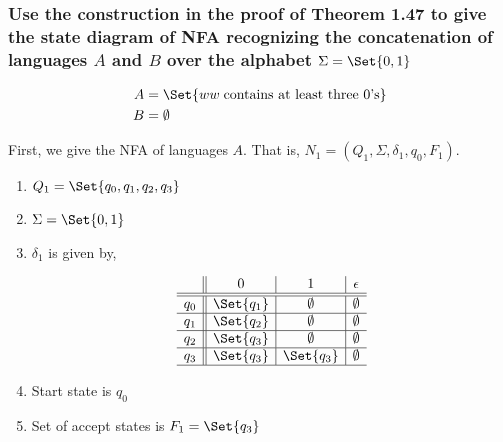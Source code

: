\documentclass{article}
\providecommand\given{} %
\begin{document}

\subsubsection{Use the construction in the proof of Theorem 1.47 to give the state diagram of NFA recognizing the concatenation of languages $A$ and $B$ over the alphabet $\Sigma = \Set{0,1}$}

\begin{align*}
    A &= \Set{w \given w \; \text{contains at least three 0's}} \\
    B &= \emptyset \\
\end{align*}

First, we give the NFA of languages $A$.  That is, $N_1 = (Q_1, \Sigma, \delta_1, q_0, F_1)$.

\begin{enumerate}
    \item $Q_1 = \Set{q_0,q_1,q_2,q_3}$
    \item $\Sigma = \Set{0,1}$
    \item $\delta_1$ is given by,
    
\begin{figure}[H]
\centering

\[
\begin{array}{c||c|c|c}
         & 0 & 1 & \epsilon \\ \hline \hline 
        q_0 & \Set{q_1} & \emptyset & \emptyset \\ \hline 
        q_1 & \Set{q_2} & \emptyset & \emptyset \\ \hline 
        q_2 & \Set{q_3} & \emptyset & \emptyset \\ \hline 
        q_3 & \Set{q_3} & \Set{q_3} & \emptyset \\ \hline 
\end{array}
\]

\caption{}
\label{fig:mylabel}
\end{figure}

    
    \item Start state is $q_0$
    \item Set of accept states is $F_1 = \Set{q_3}$
\end{enumerate}

\paragraph{}
\end{document}
